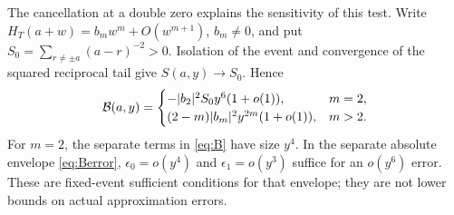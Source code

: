 The cancellation at a double zero explains the sensitivity of this test.
Write \(H_T(a+w)=b_mw^m+O(w^{m+1})\), \(b_m\ne0\), and put
\(S_0=\sum_{r\ne\pm a}(a-r)^{-2}>0\).
Isolation of the event and convergence of the squared reciprocal tail
give \(S(a,y)\to S_0\). Hence
\begin{equation}\label{eq:small-y}
 \mathcal B(a,y)=
 \begin{cases}
 -|b_2|^2 S_0 y^6(1+o(1)),&m=2,\\
 (2-m)|b_m|^2 y^{2m}(1+o(1)),&m>2.
 \end{cases}
\end{equation}
For \(m=2\), the separate terms in \eqref{eq:B} have size \(y^4\).
In the separate absolute envelope \eqref{eq:Berror},
\(\epsilon_0=o(y^4)\) and \(\epsilon_1=o(y^3)\) suffice for an
\(o(y^6)\) error. These are fixed-event sufficient conditions for that
envelope; they are not lower bounds on actual approximation errors.
